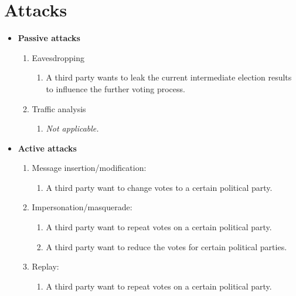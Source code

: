 \section{Attacks}
\label{sec:attacks}

\begin{itemize}
    \item \textbf{Passive attacks}
    \begin{enumerate}
        \item Eavesdropping
        \begin{enumerate}
            \item A third party wants to leak the current intermediate election results to influence the further voting process.
        \end{enumerate}
        
        \item Traffic analysis
        \begin{enumerate}
            \item \textit{Not applicable.}
        \end{enumerate}
    \end{enumerate}
    
    \item \textbf{Active attacks}
    \begin{enumerate}
        \item Message insertion/modification:
        \begin{enumerate}
            \item A third party want to change votes to a certain political party.
        \end{enumerate}
        
        \item Impersonation/masquerade:
        \begin{enumerate}
            \item A third party want to repeat votes on a certain political party.
            \item A third party want to reduce the votes for certain political parties.
        \end{enumerate}
        
        \item Replay:
        \begin{enumerate}
            \item A third party want to repeat votes on a certain political party.
        \end{enumerate}
        

\end{enumerate}
\end{itemize}
